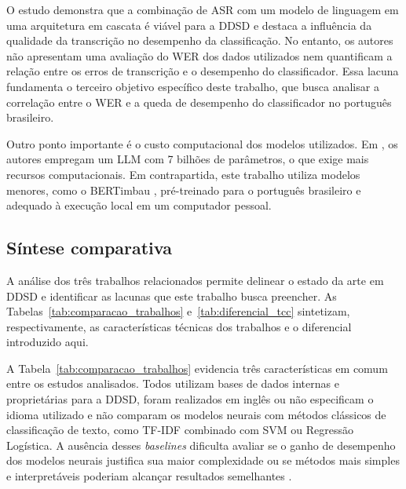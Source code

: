\documentclass[
    12pt,                %
    openright,           %
    oneside,             %
    a4paper,             %
    english,             %
    brazil               %
]{abntex2}
\begin{document}
O estudo demonstra que a combinação de ASR com um modelo de linguagem em uma arquitetura em cascata é viável para a DDSD e destaca a influência da qualidade da transcrição no desempenho da classificação. No entanto, os autores não apresentam uma avaliação do WER dos dados utilizados nem quantificam a relação entre os erros de transcrição e o desempenho do classificador. Essa lacuna fundamenta o terceiro objetivo específico deste trabalho, que busca analisar a correlação entre o WER e a queda de desempenho do classificador no português brasileiro.

Outro ponto importante é o custo computacional dos modelos utilizados. Em , os autores empregam um LLM com 7 bilhões de parâmetros, o que exige mais recursos computacionais. Em contrapartida, este trabalho utiliza modelos menores, como o BERTimbau \cite{Souza2020}, pré-treinado para o português brasileiro e adequado à execução local em um computador pessoal. 


\subsection{Síntese comparativa}
\label{sec:sintese_comparativa}

A análise dos três trabalhos relacionados permite delinear o estado da arte em DDSD e identificar as lacunas que este trabalho busca preencher. As Tabelas~\ref{tab:comparacao_trabalhos} e~\ref{tab:diferencial_tcc} sintetizam, respectivamente, as características técnicas dos trabalhos e o diferencial introduzido aqui.

A Tabela~\ref{tab:comparacao_trabalhos} evidencia três características em comum entre os estudos analisados. Todos utilizam bases de dados internas e proprietárias para a DDSD, foram realizados em inglês ou não especificam o idioma utilizado e não comparam os modelos neurais com métodos clássicos de classificação de texto, como TF-IDF combinado com SVM ou Regressão Logística. A ausência desses \textit{baselines} dificulta avaliar se o ganho de desempenho dos modelos neurais justifica sua maior complexidade ou se métodos mais simples e interpretáveis poderiam alcançar resultados semelhantes \cite{Manning2008}.
\end{document}
